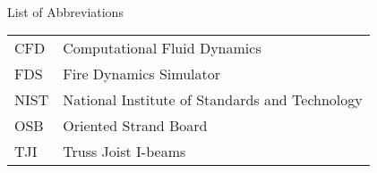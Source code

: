 
\renewcommand{\baselinestretch}{1}
\small\normalsize
\hbox{\ }

\vspace{-3em}


\begin{center}
\large{List of Abbreviations}
\end{center} 

\vspace{3pt}

\begin{tabular}{ll}
CFD & Computational Fluid Dynamics  \\
FDS & Fire Dynamics Simulator \\
NIST & National Institute of Standards and Technology \\
OSB & Oriented Strand Board \\
TJI & Truss Joist I-beams \\
\end{tabular}
